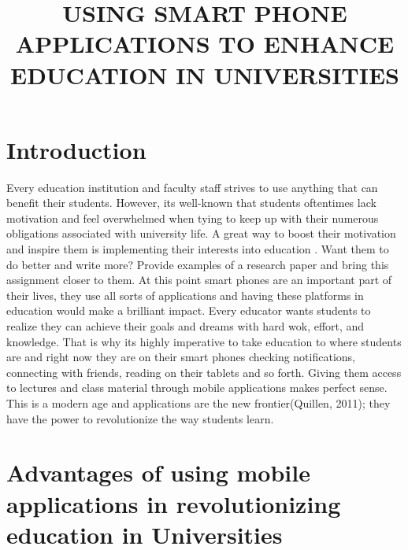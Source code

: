 \documentclass[10pt,letterpaper]{article}
\begin{document}
\title{USING SMART PHONE APPLICATIONS TO ENHANCE EDUCATION IN UNIVERSITIES}
\maketitle
\section{ Introduction }
Every education institution and faculty staff strives to use anything that can benefit their students. However, its well-known that students oftentimes lack motivation and feel overwhelmed when tying to keep up with their numerous obligations associated with university life.
A great way to boost their motivation and inspire them is implementing their interests into education . Want them to do better and write more? Provide examples of a research paper and bring this assignment closer to them. At this point smart phones are an important part of their lives, they use all sorts of applications and having these platforms in education would make a brilliant impact. Every educator wants students to realize they can achieve their goals and dreams with hard wok, effort, and knowledge. That is why its highly imperative to take education to where students are and right now they are on their smart phones checking notifications, connecting with friends, reading on their tablets and so forth. Giving them access to lectures and class material through mobile applications makes perfect sense. This is a modern age and applications are the new frontier(Quillen, 2011); they have the power to revolutionize the way students learn.  
\section{Advantages of using mobile applications in revolutionizing education in Universities}
\end{document}
